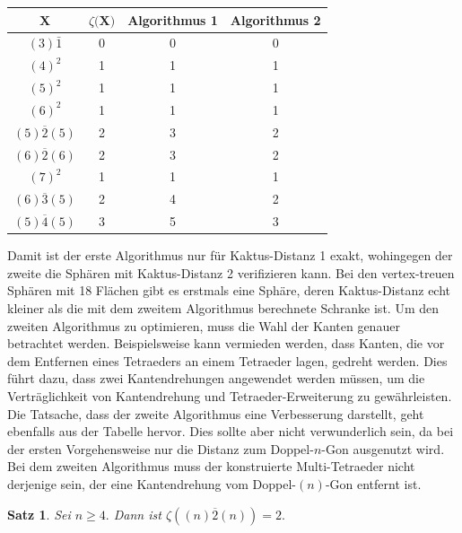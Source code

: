 \documentclass[12pt,titlepage,twoside,cleardoublepage]{article}
\theoremstyle{nummermitklammern}
\newtheorem{satz}[temp]{Satz}
\newtheorem{satz}[zahl]{Satz}
\numberwithin{equation}{section}
\begin{document}
\begin{center}
\begin{tabular}{|c|c|c|c|}
\hline

$\textbf{X}$&$\textbf{$\zeta$(X)}$&\textbf{Algorithmus 1}&\textbf{Algorithmus 2}\\
\hline
$(3)\bar{1}$&0&0&0\\
\hline
$(4)^2$&1&1&1\\
\hline
$(5)^2$&1&1&1\\
\hline
$(6)^2$&1&1&1\\
\hline
$(5)\overline{2}(5)$&2&3&2\\
\hline
$(6)\overline{2}(6)$&2&3&2\\
\hline
$(7)^2$&1&1&1\\
\hline
$(6)\overline{3}(5)$&2&4&2\\
\hline
$(5)\overline{4}(5)$&3&5&3\\
\hline
\end{tabular} 
\end{center}
Damit ist der erste Algorithmus nur für Kaktus-Distanz 1 exakt, wohingegen der zweite die Sphären mit Kaktus-Distanz 2 verifizieren kann. Bei den vertex-treuen Sphären mit 18 Flächen gibt es erstmals eine Sphäre, deren Kaktus-Distanz echt kleiner als die mit dem zweitem Algorithmus berechnete Schranke ist.
Um den zweiten Algorithmus zu optimieren, muss die Wahl der Kanten genauer betrachtet werden. Beispielsweise kann vermieden werden, dass Kanten, die vor dem Entfernen eines Tetraeders an einem Tetraeder lagen, gedreht werden. Dies führt dazu, dass zwei Kantendrehungen angewendet werden müssen, um die Verträglichkeit von Kantendrehung und Tetraeder-Erweiterung zu gewährleisten.\\
Die Tatsache, dass der zweite Algorithmus eine Verbesserung darstellt, geht ebenfalls aus der Tabelle hervor. Dies sollte aber nicht verwunderlich sein, da bei der ersten Vorgehensweise nur die Distanz zum Doppel-$n$-Gon  ausgenutzt wird. Bei dem zweiten Algorithmus muss der konstruierte Multi-Tetraeder nicht derjenige sein, der eine Kantendrehung vom Doppel-$(n)$-Gon entfernt ist.
\begin{satz}
Sei $n \geq 4.$ Dann ist $\zeta((n)\overline{2}(n))=2.$
\end{satz}
\end{document}
